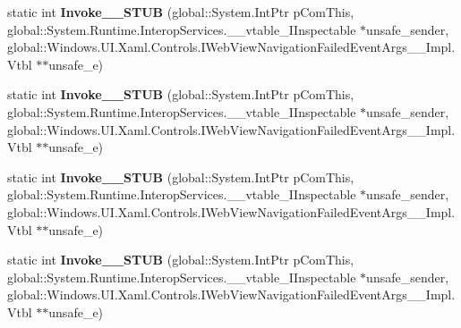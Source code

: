 \begin{DoxyCompactItemize}
\item 
\mbox{\label{struct_windows_1_1_u_i_1_1_xaml_1_1_controls_1_1_web_view_navigation_failed_event_handler_____impl_1_1_vtbl_ad72f33645ffec7b00bb806acac7203e7}} 
static int {\bfseries Invoke\+\_\+\+\_\+\+S\+T\+UB} (global\+::\+System.\+Int\+Ptr p\+Com\+This, global\+::\+System.\+Runtime.\+Interop\+Services.\+\_\+\+\_\+vtable\+\_\+\+I\+Inspectable $\ast$unsafe\+\_\+sender, global\+::\+Windows.\+U\+I.\+Xaml.\+Controls.\+I\+Web\+View\+Navigation\+Failed\+Event\+Args\+\_\+\+\_\+\+Impl.\+Vtbl $\ast$$\ast$unsafe\+\_\+e)
\item 
\mbox{\label{struct_windows_1_1_u_i_1_1_xaml_1_1_controls_1_1_web_view_navigation_failed_event_handler_____impl_1_1_vtbl_ad72f33645ffec7b00bb806acac7203e7}} 
static int {\bfseries Invoke\+\_\+\+\_\+\+S\+T\+UB} (global\+::\+System.\+Int\+Ptr p\+Com\+This, global\+::\+System.\+Runtime.\+Interop\+Services.\+\_\+\+\_\+vtable\+\_\+\+I\+Inspectable $\ast$unsafe\+\_\+sender, global\+::\+Windows.\+U\+I.\+Xaml.\+Controls.\+I\+Web\+View\+Navigation\+Failed\+Event\+Args\+\_\+\+\_\+\+Impl.\+Vtbl $\ast$$\ast$unsafe\+\_\+e)
\item 
\mbox{\label{struct_windows_1_1_u_i_1_1_xaml_1_1_controls_1_1_web_view_navigation_failed_event_handler_____impl_1_1_vtbl_ad72f33645ffec7b00bb806acac7203e7}} 
static int {\bfseries Invoke\+\_\+\+\_\+\+S\+T\+UB} (global\+::\+System.\+Int\+Ptr p\+Com\+This, global\+::\+System.\+Runtime.\+Interop\+Services.\+\_\+\+\_\+vtable\+\_\+\+I\+Inspectable $\ast$unsafe\+\_\+sender, global\+::\+Windows.\+U\+I.\+Xaml.\+Controls.\+I\+Web\+View\+Navigation\+Failed\+Event\+Args\+\_\+\+\_\+\+Impl.\+Vtbl $\ast$$\ast$unsafe\+\_\+e)
\item 
\mbox{\label{struct_windows_1_1_u_i_1_1_xaml_1_1_controls_1_1_web_view_navigation_failed_event_handler_____impl_1_1_vtbl_ad72f33645ffec7b00bb806acac7203e7}} 
static int {\bfseries Invoke\+\_\+\+\_\+\+S\+T\+UB} (global\+::\+System.\+Int\+Ptr p\+Com\+This, global\+::\+System.\+Runtime.\+Interop\+Services.\+\_\+\+\_\+vtable\+\_\+\+I\+Inspectable $\ast$unsafe\+\_\+sender, global\+::\+Windows.\+U\+I.\+Xaml.\+Controls.\+I\+Web\+View\+Navigation\+Failed\+Event\+Args\+\_\+\+\_\+\+Impl.\+Vtbl $\ast$$\ast$unsafe\+\_\+e)

\end{DoxyCompactItemize}
